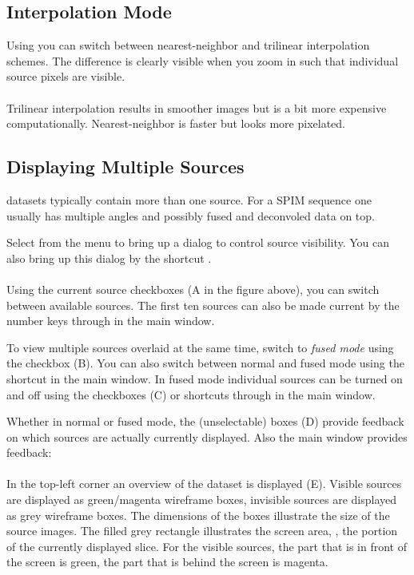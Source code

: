\documentclass{scrartcl}
\begin{document}
\newpage\subsection{Interpolation Mode}
Using  you can switch between nearest-neighbor and trilinear interpolation schemes.
The difference is clearly visible when you zoom in such that individual source pixels are visible.
\\
\\
Trilinear interpolation results in smoother images but is a bit more expensive computationally.
Nearest-neighbor is faster but looks more pixelated.

%
\newpage\subsection{Displaying Multiple Sources}
\Bdv datasets typically contain more than one source.
For a SPIM sequence one usually has multiple angles and possibly fused and deconvoled data on top.

Select  from the \bdv menu to bring up a dialog to control source visibility.
You can also bring up this dialog by the shortcut .
\\
\\
Using the current source checkboxes (A in the figure above), you can switch between available sources.
The first ten sources can also be made current by the number keys  through  in the main \bdv window.

To view multiple sources overlaid at the same time, switch to \emph{fused mode} using the checkbox (B).
You can also switch between normal and fused mode using the shortcut  in the main window.
In fused mode individual sources can be turned on and off using the checkboxes (C) or shortcuts  through  in the main window.

Whether in normal or fused mode, the (unselectable) boxes (D) provide feedback on which sources are actually currently displayed.
Also the main window provides feedback:
\\
\\
In the top-left corner an overview of the dataset is displayed (E).
Visible sources are displayed as green/magenta wireframe boxes, invisible sources are displayed as grey wireframe boxes.
The dimensions of the boxes illustrate the size of the source images. The filled grey rectangle illustrates the screen area, \ie, the portion of the currently displayed slice.
For the visible sources, the part that is in front of the screen is green, the part that is behind the screen is magenta.
\end{document}
